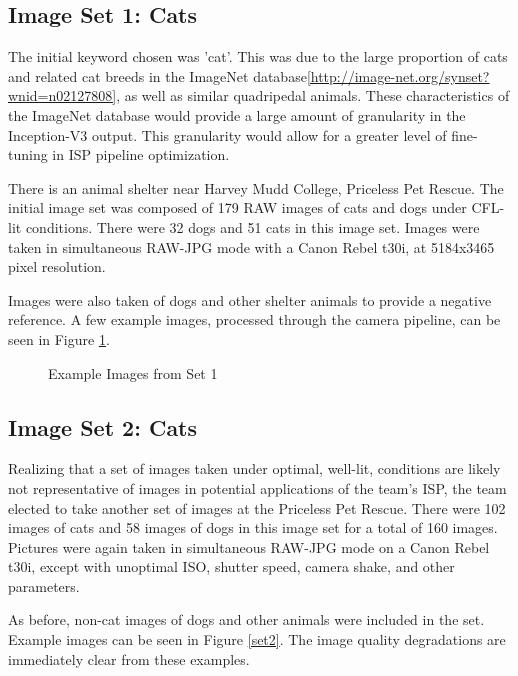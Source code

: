 \documentclass{report}
\begin{document}
		\subsection{Image Set 1: Cats}
		The initial keyword chosen was 'cat'. This was due to the large proportion of cats and related cat breeds in the ImageNet database\ref{http://image-net.org/synset?wnid=n02127808}, as well as similar quadripedal animals. These characteristics of the ImageNet database would provide a large amount of granularity in the Inception-V3 output. This granularity would allow for a greater level of fine-tuning in ISP pipeline optimization.
		
		There is an animal shelter near Harvey Mudd College, Priceless Pet Rescue\cite{http://pricelesspetrescue.org/}. The initial image set was composed of 179 RAW images of cats and dogs under CFL-lit conditions. There were 32 dogs and 51 cats in this image set. Images were taken in simultaneous RAW-JPG mode with a Canon Rebel t30i, at 5184x3465 pixel resolution.
		
		Images were also taken of dogs and other shelter animals to provide a negative reference. A few example images, processed through the camera pipeline, can be seen in Figure \ref{set1}.
		
		\begin{figure}[h]
			\begin{center}
				\caption{Example Images from Set 1}
				\label{set1}
			\end{center}
		\end{figure}
			
		\subsection{Image Set 2: Cats}
		Realizing that a set of images taken under optimal, well-lit, conditions are likely not representative of images in potential applications of the team's ISP, the team elected to take another set of images at the Priceless Pet Rescue. There were 102 images of cats and 58 images of dogs in this image set for a total of 160 images. Pictures were again taken in simultaneous RAW-JPG mode on a Canon Rebel t30i, except with unoptimal ISO, shutter speed, camera shake, and other parameters.
		
		As before, non-cat images of dogs and other animals were included in the set. Example images can be seen in Figure \ref{set2}. The image quality degradations are immediately clear from these examples.
\end{document}
